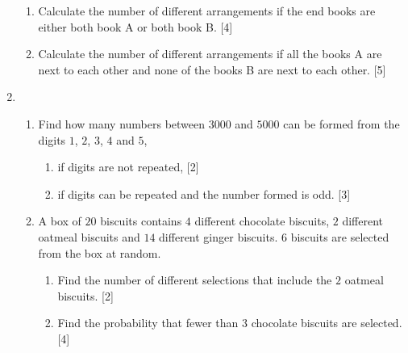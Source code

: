 \begin{enumerate}
\begin{enumerate}
	\item Calculate the number of different arrangements if the end books are either both book A or both book B. \hfill[4]
	\item Calculate the number of different arrangements if all the books A are next to each other and none of the books B are next to each other. \hfill [5]
\end{enumerate}
	
		

\item  \begin{enumerate}
	\item Find how many numbers between $3000$ and $5000$ can be formed from the digits $1$, $2$, $3$, $4$ and $5$,
	\begin{enumerate}
		\item if digits are not repeated, \hfill[2] 
		\item if digits can be repeated and the number formed is odd. \hfill[3]
	\end{enumerate}
\item A box of $20$ biscuits contains $4$ different chocolate biscuits, $2$ different oatmeal biscuits and $14$ different ginger biscuits. $6$ biscuits are selected from the box at random.

\begin{enumerate}
	\item Find the number of different selections that include the $2$ oatmeal biscuits. \hfill[2]
	\item Find the probability that fewer than $3$ chocolate biscuits are selected. \hfill[4]
\end{enumerate}

\end{enumerate}		






\end{enumerate}	
	
	
	
	\newpage 
	
	\exam   %
	
